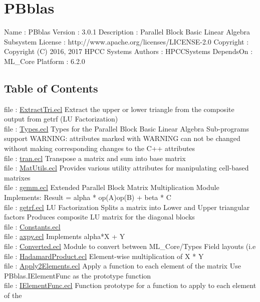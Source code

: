 \chapter*{PBblas}
\hypertarget{PBblas}{}

Name : PBblas
Version : 3.0.1
Description : Parallel Block Basic Linear Algebra Subsystem
License : http://www.apache.org/licenses/LICENSE-2.0
Copyright : Copyright (C) 2016, 2017 HPCC Systems
Authors : HPCCSystems
DependsOn : ML\_Core
Platform : 6.2.0

\section*{Table of Contents}
file : \hyperlink{PBblas.ExtractTri}{ExtractTri.ecl}  Extract the upper or lower triangle from the composite output from getrf (LU Factorization) \\
file : \hyperlink{PBblas.Types}{Types.ecl}  Types for the Parallel Block Basic Linear Algebra Sub-programs support WARNING: attributes marked with WARNING can not be changed without making corresponding changes to the C++ attributes \\
file : \hyperlink{PBblas.tran}{tran.ecl}  Transpose a matrix and sum into base matrix \\
file : \hyperlink{PBblas.MatUtils}{MatUtils.ecl}  Provides various utility attributes for manipulating cell-based matrixes \\
file : \hyperlink{PBblas.gemm}{gemm.ecl}  Extended Parallel Block Matrix Multiplication Module Implements: Result = alpha * op(A)op(B) + beta * C \\
file : \hyperlink{PBblas.getrf}{getrf.ecl}  LU Factorization Splits a matrix into Lower and Upper triangular factors Produces composite LU matrix for the diagonal blocks \\
file : \hyperlink{PBblas.Constants}{Constants.ecl}   \\
file : \hyperlink{PBblas.axpy}{axpy.ecl}  Implements alpha*X + Y \\
file : \hyperlink{PBblas.Converted}{Converted.ecl}  Module to convert between ML\_Core/Types Field layouts (i.e \\
file : \hyperlink{PBblas.HadamardProduct}{HadamardProduct.ecl}  Element-wise multiplication of X * Y \\
file : \hyperlink{PBblas.Apply2Elements}{Apply2Elements.ecl}  Apply a function to each element of the matrix Use PBblas.IElementFunc as the prototype function \\
file : \hyperlink{PBblas.IElementFunc}{IElementFunc.ecl}  Function prototype for a function to apply to each element of the \\
